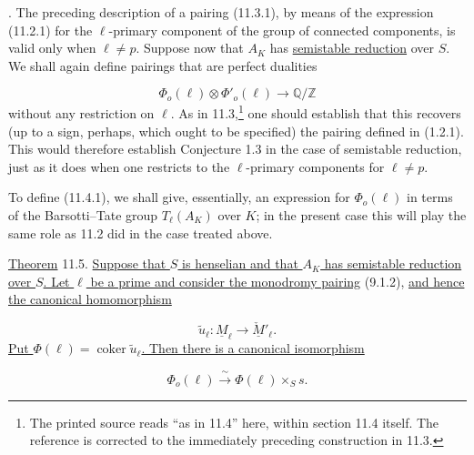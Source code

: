 
\medskip
{}. The preceding description of a pairing (11.3.1), by means of the
expression (11.2.1) for the $\ell$-primary component of the group of
connected components, is valid only when $\ell\ne p$. Suppose now that
$A_K$ has \underline{semistable reduction} over $S$. We shall again
define pairings that are perfect dualities

\begin{equation}\tag{11.4.1}
\Phi_o(\ell)\otimes\Phi'_o(\ell)\longrightarrow\mathbb Q/\mathbb Z
\end{equation}
without any restriction on $\ell$. As in 11.3,\footnote{The printed
source reads ``as in 11.4'' here, within section 11.4 itself. The
reference is corrected to the immediately preceding construction in
11.3.} one should establish that this recovers (up to a sign, perhaps,
which ought to be specified) the pairing defined in (1.2.1). This would
therefore establish Conjecture 1.3 in the case of semistable reduction,
just as it does when one restricts to the $\ell$-primary components for
$\ell\ne p$.

To define (11.4.1), we shall give, essentially, an expression for
$\Phi_o(\ell)$ in terms of the Barsotti--Tate group $T_\ell(A_K)$ over
$K$; in the present case this will play the same role as 11.2 did in
the case treated above.

\medskip
\noindent
\underline{Theorem} 11.5. \underline{Suppose that $S$ is henselian and
that $A_K$ has semistable reduction over $S$. Let $\ell$ be a prime and
consider the monodromy pairing} (9.1.2), \underline{and hence the
canonical homomorphism}

\begin{equation*}
\widetilde u_\ell:\underline M_\ell
 \longrightarrow\underline{\check M}'_\ell.
\end{equation*}
\underline{Put $\Phi(\ell)=\operatorname{coker}\widetilde u_\ell$.
Then there is a canonical isomorphism}

\begin{equation}\tag{11.5.1}
\Phi_o(\ell)\xrightarrow{\ \sim\ }\Phi(\ell)\times_S s.
\end{equation}

